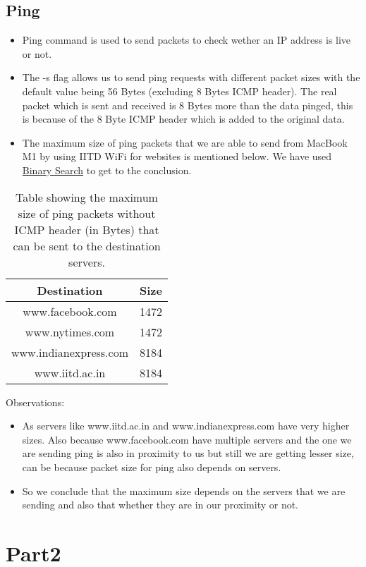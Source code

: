 \documentclass[11pt]{scrartcl}
\begin{document}
\subsection{Ping}
\begin{itemize}
    \item Ping command is used to send packets to check wether an IP address is live or not.
    \item The -s flag allows us to send ping requests with different packet sizes with the default value being 56 Bytes (excluding 8 Bytes ICMP header). The real packet which is sent and received is 8 Bytes more than the data pinged, this is because of the 8 Byte ICMP header which is added to the original data.
    \item The maximum size of ping packets that we are able to send from MacBook M1 by using IITD WiFi for websites is mentioned below. We have used \underline{Binary Search} to get to the conclusion.
\end{itemize}
\begin{table}[ht]
\centering
\begin{tabular}{|c||c|}
\hline
 Destination & Size  \\
 \hline
\hline
www.facebook.com & 1472 \\
\hline
www.nytimes.com & 1472\\
\hline
www.indianexpress.com &  8184\\
\hline
www.iitd.ac.in & 8184 \\
\hline
\end{tabular}
\caption{Table showing the maximum size of ping packets without ICMP header (in Bytes) that can be sent to the destination servers.}
\label{tab:simple}
\end{table}


\newpage
Observations:
\begin{itemize}
    \item  As servers like www.iitd.ac.in and www.indianexpress.com have very higher sizes. Also because www.facebook.com have multiple servers and the one we are sending ping is also in proximity to us but still we are getting lesser size, can be because packet size for ping also depends on servers. 
    \item So we conclude that the maximum size depends on the servers that we are sending and also that whether they are in our proximity or not.
\end{itemize}



\newpage
\section{ Part2}
\end{document}
